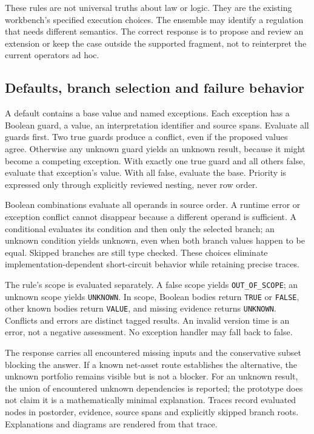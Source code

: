 These rules are not universal truths about law or logic. They are the existing
workbench's specified execution choices. The ensemble may identify a regulation
that needs different semantics. The correct response is to propose and review an
extension or keep the case outside the supported fragment, not to reinterpret
the current operators ad hoc.

\subsection{Defaults, branch selection and failure behavior}
\label{merge:P-03a-rule-contract:02}


A default contains a base value and named exceptions. Each exception has a
Boolean guard, a value, an interpretation identifier and source spans. Evaluate
all guards first. Two true guards produce a conflict, even if the proposed values
agree. Otherwise any unknown guard yields an unknown result, because it might
become a competing exception. With exactly one true guard and all others false,
evaluate that exception's value. With all false, evaluate the base. Priority is
expressed only through explicitly reviewed nesting, never row order.

Boolean combinations evaluate all operands in source order. A runtime error or
exception conflict cannot disappear because a different operand is sufficient.
A conditional evaluates its condition and then only the selected branch; an
unknown condition yields unknown, even when both branch values happen to be
equal. Skipped branches are still type checked. These choices eliminate
implementation-dependent short-circuit behavior while retaining precise traces.


The rule's scope is evaluated separately. A false scope yields
\texttt{OUT\_OF\_SCOPE}; an unknown scope yields \texttt{UNKNOWN}. In scope,
Boolean bodies return \texttt{TRUE} or \texttt{FALSE}, other known bodies return
\texttt{VALUE}, and missing evidence returns \texttt{UNKNOWN}. Conflicts and
errors are distinct tagged results. An invalid version time is an error, not a
negative assessment. No exception handler may fall back to false.

The response carries all encountered missing inputs and the conservative subset
blocking the answer. If a known net-asset route establishes the alternative,
the unknown portfolio remains visible but is not a blocker. For an unknown
result, the union of encountered unknown dependencies is reported; the prototype
does not claim it is a mathematically minimal explanation. Traces record evaluated
nodes in postorder, evidence, source spans and explicitly skipped branch roots.
Explanations and diagrams are rendered from that trace.

